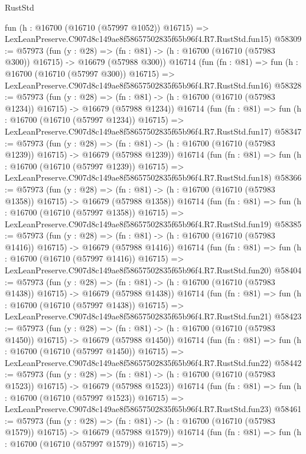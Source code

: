 \begin{lexlean}{RustStd}
\begin{coremodule}
    fun (h : @16700 (@16710 (@57997 @1052)) @16715) =>
    LexLeanPreserve.C907d8c149ae8f58657502835f65b96f4.R7.RustStd.fun15)
@58309 := @57973
    (fun (y : @28) =>
    (fn : @81) -> (h : @16700 (@16710 (@57983 @300)) @16715) -> @16679 (@57988 @300))
    @16714
    (fun (fn : @81) =>
    fun (h : @16700 (@16710 (@57997 @300)) @16715) =>
    LexLeanPreserve.C907d8c149ae8f58657502835f65b96f4.R7.RustStd.fun16)
@58328 := @57973
    (fun (y : @28) =>
    (fn : @81) -> (h : @16700 (@16710 (@57983 @1234)) @16715) -> @16679 (@57988 @1234))
    @16714
    (fun (fn : @81) =>
    fun (h : @16700 (@16710 (@57997 @1234)) @16715) =>
    LexLeanPreserve.C907d8c149ae8f58657502835f65b96f4.R7.RustStd.fun17)
@58347 := @57973
    (fun (y : @28) =>
    (fn : @81) -> (h : @16700 (@16710 (@57983 @1239)) @16715) -> @16679 (@57988 @1239))
    @16714
    (fun (fn : @81) =>
    fun (h : @16700 (@16710 (@57997 @1239)) @16715) =>
    LexLeanPreserve.C907d8c149ae8f58657502835f65b96f4.R7.RustStd.fun18)
@58366 := @57973
    (fun (y : @28) =>
    (fn : @81) -> (h : @16700 (@16710 (@57983 @1358)) @16715) -> @16679 (@57988 @1358))
    @16714
    (fun (fn : @81) =>
    fun (h : @16700 (@16710 (@57997 @1358)) @16715) =>
    LexLeanPreserve.C907d8c149ae8f58657502835f65b96f4.R7.RustStd.fun19)
@58385 := @57973
    (fun (y : @28) =>
    (fn : @81) -> (h : @16700 (@16710 (@57983 @1416)) @16715) -> @16679 (@57988 @1416))
    @16714
    (fun (fn : @81) =>
    fun (h : @16700 (@16710 (@57997 @1416)) @16715) =>
    LexLeanPreserve.C907d8c149ae8f58657502835f65b96f4.R7.RustStd.fun20)
@58404 := @57973
    (fun (y : @28) =>
    (fn : @81) -> (h : @16700 (@16710 (@57983 @1438)) @16715) -> @16679 (@57988 @1438))
    @16714
    (fun (fn : @81) =>
    fun (h : @16700 (@16710 (@57997 @1438)) @16715) =>
    LexLeanPreserve.C907d8c149ae8f58657502835f65b96f4.R7.RustStd.fun21)
@58423 := @57973
    (fun (y : @28) =>
    (fn : @81) -> (h : @16700 (@16710 (@57983 @1450)) @16715) -> @16679 (@57988 @1450))
    @16714
    (fun (fn : @81) =>
    fun (h : @16700 (@16710 (@57997 @1450)) @16715) =>
    LexLeanPreserve.C907d8c149ae8f58657502835f65b96f4.R7.RustStd.fun22)
@58442 := @57973
    (fun (y : @28) =>
    (fn : @81) -> (h : @16700 (@16710 (@57983 @1523)) @16715) -> @16679 (@57988 @1523))
    @16714
    (fun (fn : @81) =>
    fun (h : @16700 (@16710 (@57997 @1523)) @16715) =>
    LexLeanPreserve.C907d8c149ae8f58657502835f65b96f4.R7.RustStd.fun23)
@58461 := @57973
    (fun (y : @28) =>
    (fn : @81) -> (h : @16700 (@16710 (@57983 @1579)) @16715) -> @16679 (@57988 @1579))
    @16714
    (fun (fn : @81) =>
    fun (h : @16700 (@16710 (@57997 @1579)) @16715) =>

\end{coremodule}
\end{lexlean}
